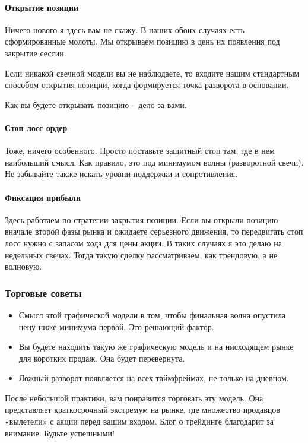 \documentclass{book}
\begin{document}
\paragraph{Открытие позиции}

Ничего нового я здесь вам не скажу. В наших обоих случаях есть сформированные молоты. Мы открываем позицию в день их появления под закрытие сессии.

Если никакой свечной модели вы не наблюдаете, то входите нашим стандартным способом открытия позиции, когда формируется точка разворота в основании.

Как вы будете открывать позицию – дело за вами.

\paragraph{Стоп лосс ордер}

Тоже, ничего особенного. Просто поставьте защитный стоп там, где в нем
наибольший смысл. Как правило, это под минимумом волны (разворотной
свечи). Не забывайте также искать уровни поддержки и сопротивления.

\paragraph{Фиксация прибыли}

Здесь работаем по стратегии закрытия позиции. Если вы открыли позицию
вначале второй фазы рынка и ожидаете серьезного движения, то
передвигать стоп лосс нужно с запасом хода для цены акции. В таких
случаях я это делаю на недельных свечах. Тогда такую сделку
рассматриваем, как трендовую, а не волновую.

\subsubsection{Торговые советы}

\begin{itemize}
\item     Смысл этой графической модели в том, чтобы финальная волна опустила цену ниже минимума первой. Это решающий фактор.
\item     Вы будете находить такую же графическую модель и на нисходящем рынке для коротких продаж. Она будет перевернута.
\item     Ложный разворот появляется на всех таймфреймах, не только на дневном.
\end{itemize}

После небольшой практики, вам понравится торговать эту модель. Она представляет краткосрочный экстремум на рынке, где множество продавцов «вылетели» с акции перед вашим входом. Блог о трейдинге благодарит за внимание. Будьте успешными!
\end{document}
